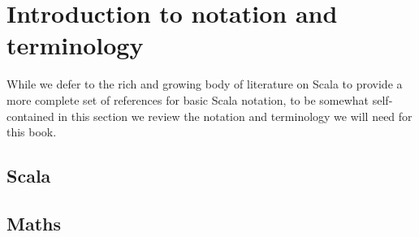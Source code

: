 \section{Introduction to notation and terminology}

While we defer to the rich and growing body of literature on Scala to
provide a more complete set of references for basic Scala notation, to
be somewhat self-contained in this section we review the notation and
terminology we will need for this book.

\subsection{Scala}

\subsection{Maths}
